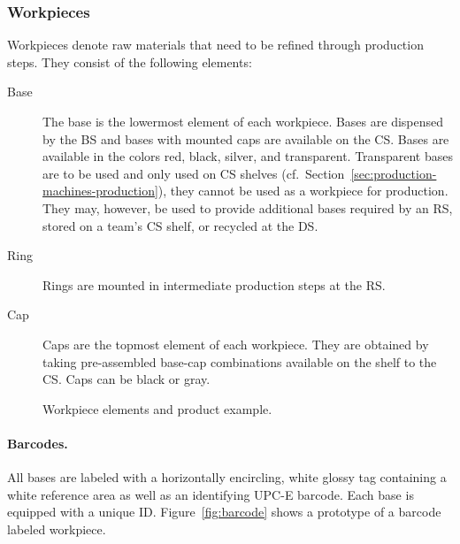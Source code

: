 \documentclass[12pt,twoside]{article}
\newcommand{\refsec}[1]{Section~\ref{#1}}
\newcommand{\reffig}[1]{Figure~\ref{#1}}
\begin{document}
\subsubsection{Workpieces}
\label{sec:workpieces}
Workpieces denote raw materials that need to be refined through production
steps.
They consist of the following elements:
\begin{description}
\item[Base] The base is the lowermost element of each workpiece.
  Bases are dispensed by the \acf{BS} and bases with mounted
  caps are available on the \acf{CS}. Bases are available in
  the colors red, black, silver, and transparent. Transparent bases
  are to be used and only used on \ac{CS} shelves
  (cf.~\refsec{sec:production-machines-production}), they cannot be
  used as a workpiece for production. They may, however, be used to
  provide additional bases required by an \ac{RS}, stored on a team's \ac{CS}
  shelf, or recycled at the \ac{DS}.
\item[Ring] Rings are mounted in intermediate production steps at the \acf{RS}.
\item[Cap] Caps are the topmost element of each workpiece. They are
  obtained by taking pre-assembled base-cap combinations available on
  the shelf to the \acf{CS}. Caps can be black or gray.
\end{description}

\begin{figure}[ht]
  \centering
  \quad
  \quad
  \caption{Workpiece elements and product example.}
  \label{fig:workpieces}
\end{figure}

\paragraph{Barcodes.}
All bases are labeled with a horizontally encircling, white glossy tag
containing a white reference area as well as an identifying
UPC-E barcode.
Each base is equipped with a unique ID\@. \reffig{fig:barcode}
shows a prototype of a barcode labeled workpiece.
\end{document}
